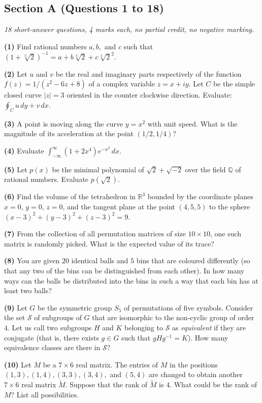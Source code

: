 \documentclass[11pt,a4paper]{article}
\newcommand{\Q}{\mathbb{Q}}
\newcommand{\R}{\mathbb{R}}
\newcommand{\examsec}[1]{%
  \subsection*{#1}
  \vspace{-2pt}
}
\newcommand{\qitem}[1]{\par\medskip\noindent\textbf{#1}\hspace{0.5em}}
\begin{document}
\examsec{Section A (Questions 1 to 18)}
\noindent\emph{18 short-answer questions, 4 marks each, no partial credit, no negative marking.}

\qitem{(1)} Find rational numbers $a, b,$ and $c$ such that $(1 + \sqrt[3]{2})^{-1} = a + b\sqrt[3]{2} + c\sqrt[3]{2}^2$.

\qitem{(2)} Let $u$ and $v$ be the real and imaginary parts respectively of the function $f(z) = 1/(z^2 - 6z + 8)$ of a complex variable $z = x + iy$. Let $C$ be the simple closed curve $|z| = 3$ oriented in the counter clockwise direction. Evaluate: $\displaystyle\oint_C u\,dy + v\,dx$.

\qitem{(3)} A point is moving along the curve $y = x^2$ with unit speed. What is the magnitude of its acceleration at the point $(1/2, 1/4)$?

\qitem{(4)} Evaluate $\displaystyle\int_{-\infty}^{\infty} (1 + 2x^4)e^{-x^2}\,dx$.

\qitem{(5)} Let $p(x)$ be the minimal polynomial of $\sqrt{2} + \sqrt{-2}$ over the field $\Q$ of rational numbers. Evaluate $p(\sqrt{2})$.

\qitem{(6)} Find the volume of the tetrahedron in $\R^3$ bounded by the coordinate planes $x = 0$, $y = 0$, $z = 0$, and the tangent plane at the point $(4, 5, 5)$ to the sphere $(x - 3)^2 + (y - 3)^2 + (z - 3)^2 = 9$.

\qitem{(7)} From the collection of all permutation matrices of size $10 \times 10$, one such matrix is randomly picked. What is the expected value of its trace?

\qitem{(8)} You are given $20$ identical balls and $5$ bins that are coloured differently (so that any two of the bins can be distinguished from each other). In how many ways can the balls be distributed into the bins in such a way that each bin has at least two balls?

\qitem{(9)} Let $G$ be the symmetric group $S_5$ of permutations of five symbols. Consider the set $\mathcal{S}$ of subgroups of $G$ that are isomorphic to the non-cyclic group of order $4$. Let us call two subgroups $H$ and $K$ belonging to $\mathcal{S}$ as \emph{equivalent} if they are conjugate (that is, there exists $g \in G$ such that $gHg^{-1} = K$). How many equivalence classes are there in $\mathcal{S}$?

\qitem{(10)} Let $M$ be a $7 \times 6$ real matrix. The entries of $M$ in the positions $(1, 3), (1, 4), (3, 3), (3, 4),$ and $(5, 4)$ are changed to obtain another $7 \times 6$ real matrix $\widetilde{M}$. Suppose that the rank of $\widetilde{M}$ is $4$. What could be the rank of $M$? List all possibilities.
\end{document}
